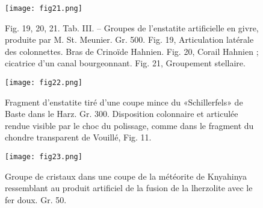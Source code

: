 \documentclass[a4paper, 12pt, oneside, french]{book}
\begin{document}
\begin{figure}[b]
\texttt{[image: fig21.png]}
\caption{Fig. 19, 20, 21. Tab. III. – Groupes de l'enstatite artificielle en givre, produite par M. St. Meunier. Gr. 500. Fig. 19, Articulation latérale des colonnettes. Bras de Crinoïde Hahnien. Fig. 20, Corail Hahnien ; cicatrice d'un canal bourgeonnant. Fig. 21, Groupement stellaire.}
\centering
\end{figure}
\begin{figure}[b]
\texttt{[image: fig22.png]}
\caption{Fragment d'enstatite tiré d'une coupe mince du «Schillerfels» de Baste dans le Harz. Gr. 300. Disposition colonnaire et articulée rendue visible par le choc du polissage, comme dans le fragment du chondre transparent de Vouillé, Fig. 11.}
\centering
\end{figure}
\begin{figure}[b]
\texttt{[image: fig23.png]}
\caption{Groupe de cristaux dans une coupe de la météorite de Knyahinya ressemblant au produit artificiel de la fusion de la lherzolite avec le fer doux. Gr. 50.}
\centering
\end{figure}
\end{document}
